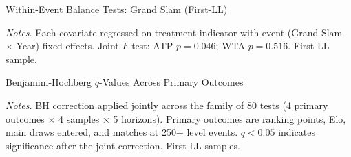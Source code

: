 
\begin{table}[htbp]
\centering
\caption{Within-Event Balance Tests: Grand Slam (First-LL)}
\label{tab:balance_within}
\begin{threeparttable}
\small

\begin{tablenotes}
\footnotesize
\item \textit{Notes.} Each covariate regressed on treatment indicator with event (Grand Slam $\times$ Year) fixed effects. Joint $F$-test: ATP $p = 0.046$; WTA $p = 0.516$. First-LL sample.
\end{tablenotes}
\end{threeparttable}
\end{table}


\begin{table}[!p]
\centering
\caption{Benjamini-Hochberg $q$-Values Across Primary Outcomes}
\label{tab:bh}
\begin{threeparttable}
\scriptsize
\begin{adjustbox}{max totalheight=0.85\textheight}

\end{adjustbox}
\begin{tablenotes}
\footnotesize
\item \textit{Notes.} BH correction applied jointly across the family of 80 tests (4 primary outcomes $\times$ 4 samples $\times$ 5 horizons). Primary outcomes are ranking points, Elo, main draws entered, and matches at 250+ level events. $q < 0.05$ indicates significance after the joint correction. First-LL samples.
\end{tablenotes}
\end{threeparttable}
\end{table}


